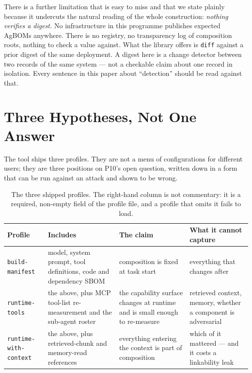 \documentclass[11pt]{article}
\begin{document}
There is a further limitation that is easy to miss and that we state plainly
because it undercuts the natural reading of the whole construction:
\emph{nothing verifies a digest.} No infrastructure in this programme
publishes expected AgBOMs anywhere. There is no registry, no
transparency log of composition roots, nothing to check a value against. What
the library offers is \texttt{diff} against a prior digest of the same
deployment. A digest here is a change detector between two records of the same
system --- not a checkable claim about one record in isolation. Every
sentence in this paper about ``detection'' should be read against that.

\section{Three Hypotheses, Not One Answer}
\label{sec:profiles}

The tool ships three profiles. They are not a menu of configurations for
different users; they are three positions on P10's open question, written down
in a form that can be run against an attack and shown to be wrong.

\begin{table}[htbp]
\centering
\small
\begin{tabular}{@{}L{2.9cm}L{4.2cm}L{3.3cm}L{4.2cm}@{}}
\toprule
\textbf{Profile} & \textbf{Includes} & \textbf{The claim} &
\textbf{What it cannot capture} \\
\midrule
\texttt{build-manifest} &
model, system prompt, tool definitions, code and dependency SBOM &
composition is fixed at task start &
everything that changes after \\
\addlinespace
\texttt{runtime-tools} &
the above, plus MCP tool-list re-measurement and the sub-agent roster &
the capability surface changes at runtime and is small enough to re-measure &
retrieved context, memory, whether a component is adversarial \\
\addlinespace
\texttt{runtime-\hspace{0pt}with-context} &
the above, plus retrieved-chunk and memory-read references &
everything entering the context is part of composition &
which of it mattered --- and it costs a linkability leak \\
\bottomrule
\end{tabular}
\caption{The three shipped profiles. The right-hand column is not commentary:
it is a required, non-empty field of the profile file, and a profile that
omits it fails to load.}
\label{tab:profiles}
\end{table}
\end{document}
